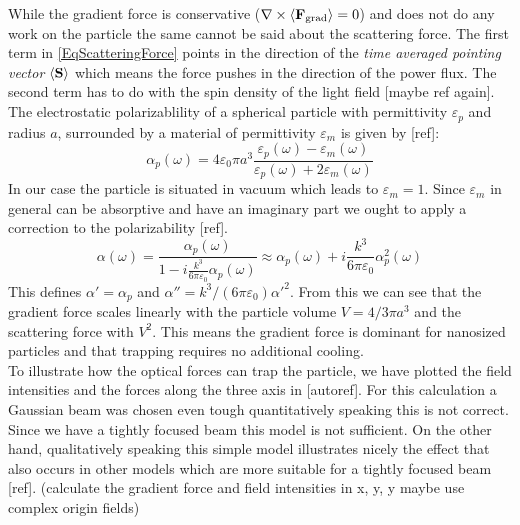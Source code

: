 While the gradient force is conservative ($\nabla\times\av{\field{F}{grad}}=0$) and does not do any work on the particle the same cannot be said about the scattering force. The first term in \autoref{EqScatteringForce} points in the direction of the \textit{time averaged pointing vector} $\av{\vc{S}}$ which means the force pushes in the direction of the power flux. The second term has to do with the spin density of the light field [maybe ref again].\\
The electrostatic polarizablility of a spherical particle with permittivity $\varepsilon_{\si{p}}$ and radius $a$, surrounded by a material of permittivity $\varepsilon_{\si{m}}$ is given by [ref]:
\begin{equation}
	\alpha_{\si{p}}(\omega)=4\varepsilon_0\pi a^3\frac{\varepsilon_{\si{p}}(\omega)-\varepsilon_{\si{m}}(\omega)}{\varepsilon_{\si{p}}(\omega)+2\varepsilon_{\si{m}}(\omega)}
\end{equation}
In our case the particle is situated in vacuum which leads to $\varepsilon_{\si{m}}=1$. Since $\varepsilon_{\si{m}}$ in general can be absorptive and have an imaginary part we ought to apply a correction to the polarizability [ref].
\begin{equation}
	\alpha(\omega)=\frac{\alpha_{\si{p}}(\omega)}{1-i\frac{k^3}{6\pi\varepsilon_0}\alpha_{\si{p}}(\omega)}\approx\alpha_{\si{p}}(\omega)+i\frac{k^3}{6\pi\varepsilon_0}\alpha_{\si{p}}^2(\omega)
\end{equation}
This defines $\alpha'=\alpha_{\si{p}}$ and $\alpha''=k^3/(6\pi\varepsilon_0)\alpha'^2$. From this we can see that the gradient force scales linearly with the particle volume $V=4/3\pi a^3$ and the scattering force with $V^2$. This means the gradient force is dominant for nanosized particles and that trapping requires no additional cooling.\\
To illustrate how the optical forces can trap the particle, we have plotted the field intensities and the forces along the three axis in [autoref]. For this calculation a Gaussian beam was chosen even tough quantitatively speaking this is not correct. Since we have a tightly focused beam this model is not sufficient. On the other hand, qualitatively speaking this simple model illustrates nicely the effect that also occurs in other models which are more suitable for a tightly focused beam [ref].
(calculate the gradient force and field intensities in x, y, y  maybe use complex origin fields)

